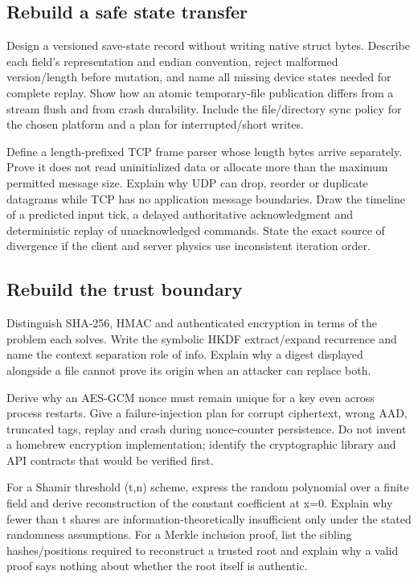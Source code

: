 \subsection{Rebuild a safe state transfer}\label{rebuild-a-safe-state-transfer}

Design a versioned save-state record without writing native struct bytes. Describe each field's representation and endian convention, reject malformed version/length before mutation, and name all missing device states needed for complete replay. Show how an atomic temporary-file publication differs from a stream flush and from crash durability. Include the file/directory sync policy for the chosen platform and a plan for interrupted/short writes.

Define a length-prefixed TCP frame parser whose length bytes arrive separately. Prove it does not read uninitialized data or allocate more than the maximum permitted message size. Explain why UDP can drop, reorder or duplicate datagrams while TCP has no application message boundaries. Draw the timeline of a predicted input tick, a delayed authoritative acknowledgment and deterministic replay of unacknowledged commands. State the exact source of divergence if the client and server physics use inconsistent iteration order.

\subsection{Rebuild the trust boundary}\label{rebuild-the-trust-boundary}

Distinguish SHA-256, HMAC and authenticated encryption in terms of the problem each solves. Write the symbolic HKDF extract/expand recurrence and name the context separation role of info. Explain why a digest displayed alongside a file cannot prove its origin when an attacker can replace both.

Derive why an AES-GCM nonce must remain unique for a key even across process restarts. Give a failure-injection plan for corrupt ciphertext, wrong AAD, truncated tags, replay and crash during nonce-counter persistence. Do not invent a homebrew encryption implementation; identify the cryptographic library and API contracts that would be verified first.

For a Shamir threshold (t,n) scheme, express the random polynomial over a finite field and derive reconstruction of the constant coefficient at x=0. Explain why fewer than t shares are information-theoretically insufficient only under the stated randomness assumptions. For a Merkle inclusion proof, list the sibling hashes/positions required to reconstruct a trusted root and explain why a valid proof says nothing about whether the root itself is authentic.

